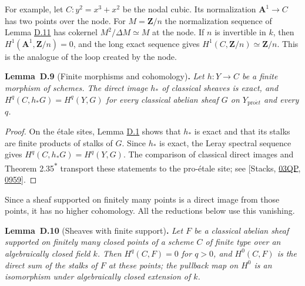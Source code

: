 \documentclass[11pt]{article}
\newenvironment{bpstatement}[2]{\par\addvspace{0.6\baselineskip}\noindent\textbf{#1}#2\textbf{.}\enspace\ignorespaces}
  {\par\addvspace{0.4\baselineskip}}
\newenvironment{bpstatementit}[2]{\begin{bpstatement}{#1}{#2}\itshape\ignorespaces}{\end{bpstatement}}
\newcommand{\bpout}[1]{#1\textsuperscript{\hyperlink{bp-outside}{\ensuremath{\ast}}}}
\begin{document}
For example, let \(C:y^2=x^3+x^2\) be the nodal cubic. Its normalization \(\mathbf A^1\to C\) has two points over the node. For \(M=\mathbf Z/n\) the normalization sequence of Lemma \hyperref[bp207]{D.11} has cokernel \(M^2/\Delta M\simeq M\) at the node. If \(n\) is invertible in \(k\), then \(H^1(\mathbf A^1,\mathbf Z/n)=0\), and the long exact sequence gives \(H^1(C,\mathbf Z/n)\simeq\mathbf Z/n\). This is the analogue of the loop created by the node.

\label{bp201}%
\begin{bpstatementit}{Lemma~D.9}{ (Finite morphisms and cohomology)}
Let \(h:Y\to C\) be a finite morphism of schemes. The direct image \(h_*\) of classical sheaves is exact, and \(H^q(C,h_*G)=H^q(Y,G)\) for every classical abelian sheaf \(G\) on \(Y_{\mathrm{pro}\acute{e}t}\) and every \(q\).
\end{bpstatementit}

\begin{proof}[{Proof}]\label{bp202}%
On the étale sites, Lemma \hyperref[bp174]{D.1} shows that \(h_*\) is exact and that its stalks are finite products of stalks of \(G\).  Since \(h_*\) is exact, the Leray spectral sequence gives \(H^q(C,h_*G)=H^q(Y,G)\).  The comparison of classical direct images and Theorem \bpout{2.35} transport these statements to the pro-étale site; see [Stacks, \href{https://stacks.math.columbia.edu/tag/03QP}{03QP}, \href{https://stacks.math.columbia.edu/tag/0959}{0959}].
\end{proof}

\label{bp203}%
Since a sheaf supported on finitely many points is a direct image from those points, it has no higher cohomology. All the reductions below use this vanishing.

\label{bp204}%
\begin{bpstatementit}{Lemma~D.10}{ (Sheaves with finite support)}
Let \(F\) be a classical abelian sheaf supported on finitely many closed points of a scheme \(C\) of finite type over an algebraically closed field \(k\). Then \(H^q(C,F)=0\) for \(q>0\), and \(H^0(C,F)\) is the direct sum of the stalks of \(F\) at these points; the pullback map on \(H^0\) is an isomorphism under algebraically closed extension of \(k\).
\end{bpstatementit}
\end{document}
